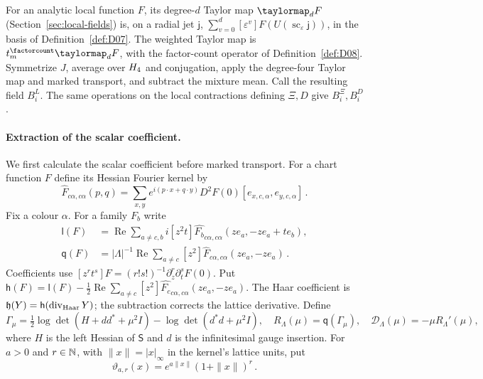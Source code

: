 For an analytic local function $F$, its degree-$d$ Taylor map $\taylormap_dF$ (Section~\ref{sec:local-fields}) is, on a radial jet $\mathsf j$, $\sum_{v=0}^d[\varepsilon^v]F(U(\operatorname{sc}_\varepsilon\mathsf j))$, in the basis of Definition~\ref{def:D07}. The weighted Taylor map is $t_m^{\factorcount}\taylormap_dF$, with the factor-count operator of Definition~\ref{def:D08}. Symmetrize $J$, average over $H_4$ and conjugation, apply the degree-four Taylor map and marked transport, and subtract the mixture mean. Call the resulting field $B_i^L$. The same operations on the local contractions defining $\Xi,D$ give $B_i^\Xi,B_i^D$.

\paragraph{Extraction of the scalar coefficient.}
We first calculate the scalar coefficient before marked transport. For a chart function $F$ define its Hessian Fourier kernel by
\begin{equation*}
\widehat F_{c\alpha,c\alpha}(p,q)=\sum_{x,y}e^{i(p\cdot x+q\cdot y)}D^2F(0)[e_{x,c,\alpha},e_{y,c,\alpha}]\,.
\end{equation*}
Fix a colour $\alpha$. For a family $F_b$ write
\begin{equation*}
\begin{aligned}
\mathsf l(F)&=\operatorname{Re}\sum_{a\ne c,b}i[z^2t]\widehat{F_b}_{c\alpha,c\alpha}(ze_a,-ze_a+te_b),\\
\mathsf q(F)&=|\Lambda|^{-1}\operatorname{Re}\sum_{a\ne c}[z^2]\widehat F_{c\alpha,c\alpha}(ze_a,-ze_a)\,.
\end{aligned}
\end{equation*}
Coefficients use $[z^rt^s]F=(r!s!)^{-1}\partial_z^r\partial_t^sF(0)$. Put $\mathsf h(F)=\mathsf l(F)-\frac12\operatorname{Re}\sum_{a\ne c}[z^2]\widehat{F_c}_{c\alpha,c\alpha}(ze_a,-ze_a)$. The Haar coefficient is $\mathfrak h(Y)=\mathsf h(\operatorname{div}_{\rm Haar}Y)$; the subtraction corrects the lattice derivative. Define
\begin{equation*}
\Gamma_\mu=\tfrac12\log\det(H+dd^*+\mu^2I)-\log\det(d^*d+\mu^2I),\quad
R_\Lambda(\mu)=\mathsf q(\Gamma_\mu),\quad \mathcal D_\Lambda(\mu)=-\mu R_\Lambda'(\mu),
\end{equation*}
where $H$ is the left Hessian of $\mathsf S$ and $d$ is the infinitesimal gauge insertion.
For $a>0$ and $r\in\mathbb{N}$, with $\|x\|=|x|_\infty$ in the kernel's lattice units, put
\begin{equation*}
\vartheta_{a,r}(x)=e^{a\|x\|}(1+\|x\|)^r\,.
\end{equation*}
